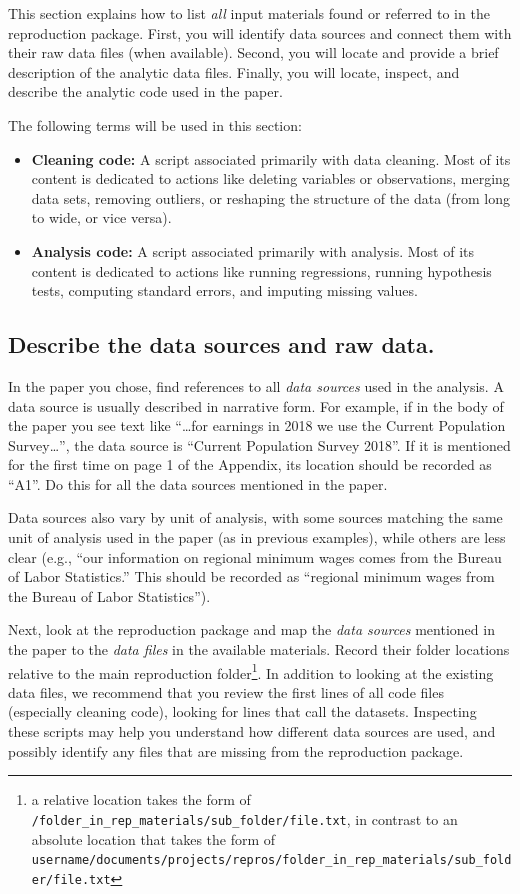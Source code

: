 \documentclass[]{book}
\begin{document}
This section explains how to list \emph{all} input materials found or referred to in the reproduction package. First, you will identify data sources and connect them with their raw data files (when available). Second, you will locate and provide a brief description of the analytic data files. Finally, you will locate, inspect, and describe the analytic code used in the paper.

The following terms will be used in this section:

\begin{itemize}
\item
  \textbf{Cleaning code:} A script associated primarily with data cleaning. Most of its content is dedicated to actions like deleting variables or observations, merging data sets, removing outliers, or reshaping the structure of the data (from long to wide, or vice versa).
\item
  \textbf{Analysis code:} A script associated primarily with analysis. Most of its content is dedicated to actions like running regressions, running hypothesis tests, computing standard errors, and imputing missing values.
\end{itemize}

\hypertarget{desc-sourc}{%
\subsection{Describe the data sources and raw data.}\label{desc-sourc}}

In the paper you chose, find references to all \emph{data sources} used in the analysis. A data source is usually described in narrative form. For example, if in the body of the paper you see text like ``\ldots{}for earnings in 2018 we use the Current Population Survey\ldots{}'', the data source is ``Current Population Survey 2018''. If it is mentioned for the first time on page 1 of the Appendix, its location should be recorded as ``A1''. Do this for all the data sources mentioned in the paper.

Data sources also vary by unit of analysis, with some sources matching the same unit of analysis used in the paper (as in previous examples), while others are less clear (e.g., ``our information on regional minimum wages comes from the Bureau of Labor Statistics.'' This should be recorded as ``regional minimum wages from the Bureau of Labor Statistics'').

Next, look at the reproduction package and map the \emph{data sources} mentioned in the paper to the \emph{data files} in the available materials. Record their folder locations relative to the main reproduction folder\footnote{a relative location takes the form of \texttt{/folder\_in\_rep\_materials/sub\_folder/file.txt}, in contrast to an absolute location that takes the form of \texttt{username/documents/projects/repros/folder\_in\_rep\_materials/sub\_folder/file.txt}}. In addition to looking at the existing data files, we recommend that you review the first lines of all code files (especially cleaning code), looking for lines that call the datasets. Inspecting these scripts may help you understand how different data sources are used, and possibly identify any files that are missing from the reproduction package.
\end{document}
